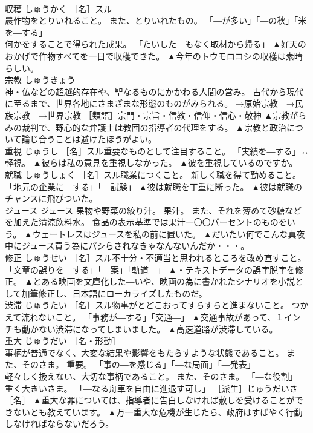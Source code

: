 \documentclass[8pt]{extreport}
\begin{document}
\begin{CJK}{UTF8}{min}
\\	収穫	しゅうかく	［名］スル 
\\	農作物をとりいれること。 また、とりいれたもの。 「―が多い」「―の秋」「米を―する」 
\\	何かをすることで得られた成果。 「たいした―もなく取材から帰る」	▲好天のおかげで作物すべてを一日で収穫できた。 ▲今年のトウモロコシの収穫は素晴らしい。
\\	宗教	しゅうきょう	
\\	神・仏などの超越的存在や、聖なるものにかかわる人間の営み。 古代から現代に至るまで、世界各地にさまざまな形態のものがみられる。 →原始宗教　→民族宗教　→世界宗教 ［類語］宗門・宗旨・信教・信仰・信心・敬神	▲宗教がらみの裁判で、野心的な弁護士は教団の指導者の代理をする。 ▲宗教と政治について論じ合うことは避けたほうがよい。
\\	重視	じゅうし	［名］スル重要なものとして注目すること。 「実績を―する」↔軽視。	▲彼らは私の意見を重視しなかった。 ▲彼を重視しているのですか。
\\	就職	しゅうしょく	［名］スル職業につくこと。 新しく職を得て勤めること。 「地元の企業に―する」「―試験」	▲彼は就職を丁重に断った。 ▲彼は就職のチャンスに飛びついた。
\\	ジュース	ジュース	果物や野菜の絞り汁。 果汁。 また、それを薄めて砂糖などを加えた清涼飲料水。 食品の表示基準では果汁一〇〇パーセントのものをいう。	▲ウェートレスはジュースを私の前に置いた。 ▲だいたい何でこんな真夜中にジュース買う為にパシらされなきゃなんないんだか・・・。
\\	修正	しゅうせい	［名］スル不十分・不適当と思われるところを改め直すこと。 「文章の誤りを―する」「―案」「軌道―」	▲・テキストデータの誤字脱字を修正。 ▲とある映画を文庫化した―いや、映画の為に書かれたシナリオを小説として加筆修正し、日本語にローカライズしたものだ。
\\	渋滞	じゅうたい	［名］スル物事がとどこおってすらすらと進まないこと。 つかえて流れないこと。 「事務が―する」「交通―」	▲交通事故があって、１インチも動かない渋滞になってしまいました。 ▲高速道路が渋滞している。
\\	重大	じゅうだい	［名・形動］ 
\\	事柄が普通でなく、大変な結果や影響をもたらすような状態であること。 また、そのさま。 重要。 「事の―を感じる」「―な局面」「―発表」 
\\	軽々しく扱えない、大切な事柄であること。 また、そのさま。 「―な役割」 
\\	重く大きいさま。 「―なる舟車を自由に進退す可し」 ［派生］じゅうだいさ［名］	▲重大な罪については、指導者に告白しなければ赦しを受けることができないとも教えています。 ▲万一重大な危機が生じたら、政府はすばやく行動しなければならないだろう。

\end{CJK}
\end{document}
